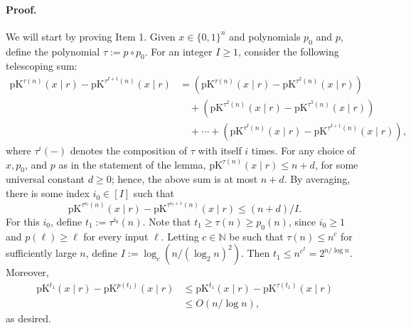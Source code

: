 \documentclass[10pt,a4paper]{article}
\begin{document}
\paragraph{Proof.} We will start by proving Item 1. Given $x\in\{0,1\}^n$ and polynomials $p_0$ and $p$, define the polynomial $\tau:=p\circ p_0$. For an integer $I\geq1$, consider the following telescoping sum:
\begin{align*}
\mathrm{pK}^{\tau(n)}(x\mid r)-\mathrm{pK}^{\tau^{I+1}(n)}(x\mid r)
&=(\mathrm{pK}^{\tau(n)}(x\mid r)-\mathrm{pK}^{\tau^2(n)}(x\mid r))\\
&\quad+(\mathrm{pK}^{\tau^2(n)}(x\mid r)-\mathrm{pK}^{\tau^3(n)}(x\mid r))\\
&\quad+\cdots+(\mathrm{pK}^{\tau^I(n)}(x\mid r)-\mathrm{pK}^{\tau^{I+1}(n)}(x\mid r)),
\end{align*}
where $\tau^i(-)$ denotes the composition of $\tau$ with itself $i$ times. For any choice of $x,p_0$, and $p$ as in the statement of the lemma, $\mathrm{pK}^{\tau(n)}(x\mid r)\leq n+d$, for some universal constant $d\geq0$; hence, the above sum is at most $n+d$. By averaging, there is some index $i_0\in[I]$ such that
\[\mathrm{pK}^{\tau^{i_0}(n)}(x\mid r)-\mathrm{pK}^{\tau^{i_0+1}(n)}(x\mid r)\leq(n+d)/I.\]
For this $i_0$, define $t_1:=\tau^{i_0}(n)$. Note that $t_1\geq\tau(n)\geq p_0(n)$, since $i_0\geq1$ and $p(\ell)\geq\ell$ for every input $\ell$. Letting $c\in\mathbb N$ be such that $\tau(n)\leq n^c$ for sufficiently large $n$, define $I:=\log_c(n/(\log_2n)^2)$. Then $t_1\leq n^{c^I}=2^{n/\log n}$. Moreover,
\begin{align*}
\mathrm{pK}^{t_1}(x\mid r)-\mathrm{pK}^{p(t_1)}(x\mid r)&\leq\mathrm{pK}^{t_1}(x\mid r)-\mathrm{pK}^{\tau(t_1)}(x\mid r)\\
&\leq O(n/\log n),
\end{align*}
as desired.

\end{document}
